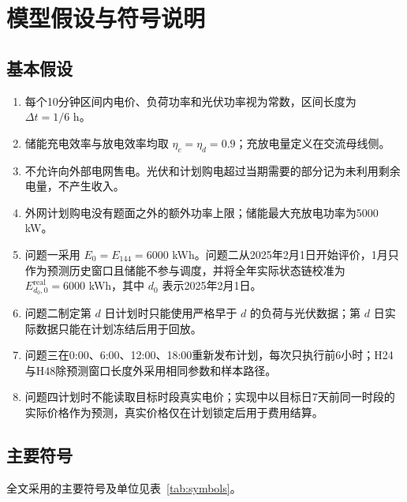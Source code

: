 \documentclass[UTF8,12pt,a4paper]{ctexart}
\begin{document}
\section{模型假设与符号说明}

\subsection{基本假设}

\begin{enumerate}
  \item 每个10分钟区间内电价、负荷功率和光伏功率视为常数，区间长度为 $\Delta t=1/6$ h。
  \item 储能充电效率与放电效率均取 $\eta_c=\eta_d=0.9$；充放电量定义在交流母线侧。
  \item 不允许向外部电网售电。光伏和计划购电超过当期需要的部分记为未利用剩余电量，不产生收入。
  \item 外网计划购电没有题面之外的额外功率上限；储能最大充放电功率为5000 kW。
  \item 问题一采用 $E_0=E_{144}=6000$ kWh。问题二从2025年2月1日开始评价，1月只作为预测历史窗口且储能不参与调度，并将全年实际状态链校准为 $E_{d_0,0}^{\mathrm{real}}=6000$ kWh，其中 $d_0$ 表示2025年2月1日。
  \item 问题二制定第 $d$ 日计划时只能使用严格早于 $d$ 的负荷与光伏数据；第 $d$ 日实际数据只能在计划冻结后用于回放。
  \item 问题三在0:00、6:00、12:00、18:00重新发布计划，每次只执行前6小时；H24与H48除预测窗口长度外采用相同参数和样本路径。
  \item 问题四计划时不能读取目标时段真实电价；实现中以目标日7天前同一时段的实际价格作为预测，真实价格仅在计划锁定后用于费用结算。
\end{enumerate}

\subsection{主要符号}

全文采用的主要符号及单位见表~\ref{tab:symbols}。
\end{document}
